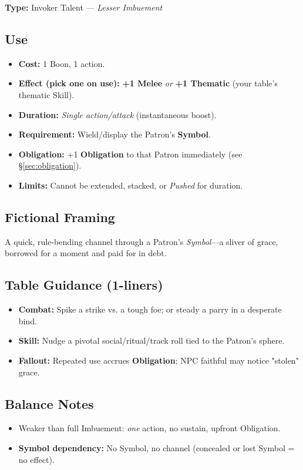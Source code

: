 \textbf{Type:} Invoker Talent — \textit{Lesser Imbuement}

\subsection*{Use}
\begin{itemize}
  \item \textbf{Cost:} 1 Boon, 1 action.
  \item \textbf{Effect (pick one on use):} \textbf{+1 Melee} \emph{or} \textbf{+1 Thematic} (your table's thematic Skill).
  \item \textbf{Duration:} \textit{Single action/attack} (instantaneous boost).
  \item \textbf{Requirement:} Wield/display the Patron's \textbf{Symbol}.
  \item \textbf{Obligation:} +1 \textbf{Obligation} to that Patron immediately (see \S\ref{sec:obligation}).
  \item \textbf{Limits:} Cannot be extended, stacked, or \emph{Pushed} for duration.
\end{itemize}

\subsection*{Fictional Framing}
A quick, rule-bending channel through a Patron's \emph{Symbol}—a sliver of grace, borrowed for a moment and paid for in debt.

\subsection*{Table Guidance (1-liners)}
\begin{itemize}
  \item \textbf{Combat:} Spike a strike vs. a tough foe; or steady a parry in a desperate bind.
  \item \textbf{Skill:} Nudge a pivotal social/ritual/track roll tied to the Patron's sphere.
  \item \textbf{Fallout:} Repeated use accrues \textbf{Obligation}; NPC faithful may notice "stolen" grace.
\end{itemize}

\subsection*{Balance Notes}
\begin{itemize}
  \item Weaker than full Imbuement: \emph{one} action, no sustain, upfront Obligation.
  \item \textbf{Symbol dependency:} No Symbol, no channel (concealed or lost Symbol = no effect).
\end{itemize}

